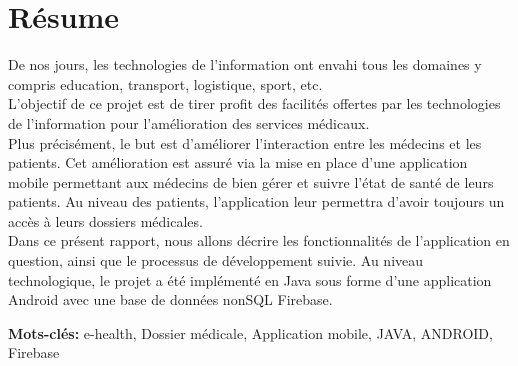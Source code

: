 \chapter*{Résume}
{\large
De nos jours, les technologies de l’information ont envahi tous les domaines y compris education, transport, logistique, sport, etc. \\
L’objectif de ce projet est de tirer profit des facilités offertes par les technologies de l’information pour l’amélioration des services médicaux. \\
Plus précisément, le but est d’améliorer l’interaction entre les médecins et les patients. Cet amélioration est assuré via la mise en place
d’une application mobile permettant aux médecins de bien gérer et suivre l’état de santé de leurs patients. Au niveau des patients, l’application
leur permettra d’avoir toujours un accès à leurs dossiers médicales. \\

Dans ce présent rapport, nous allons décrire les fonctionnalités de l’application en question, ainsi que le processus de développement suivie. Au niveau technologique, le projet a été implémenté en Java sous forme d’une application Android avec une base de données nonSQL Firebase.
}

\vspace{3cm}

{\large\textbf{Mots-clés:}}
e-health, Dossier médicale, Application mobile, JAVA, ANDROID, Firebase
